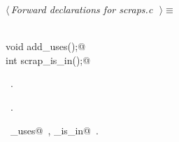 \documentclass{report}
\begin{document}
\begin{flushleft} \small
\begin{minipage}{\linewidth} \label{scrap225}
$\langle\,${\it Forward declarations for scraps.c}\nobreak\ {\footnotesize {}}$\,\rangle\equiv$
\vspace{-1ex}
\begin{list}{}{} \item
\mbox{}\verb@@\\
\mbox{}\verb@static void add_uses();@\\
\mbox{}\verb@static int scrap_is_in();@\\
\mbox{}\verb@@{\NWsep}
\end{list}
\vspace{-1ex}
\footnotesize\addtolength{\baselineskip}{-1ex}
\begin{list}{}{\setlength{\itemsep}{-\parsep}\setlength{\itemindent}{-\leftmargin}}
\item \NWtxtMacroDefBy\ .
\item \NWtxtMacroRefIn\ .
\end{list}
\vspace{-2ex}
\footnotesize\addtolength{\baselineskip}{-1ex}
\begin{list}{}{\setlength{\itemsep}{-\parsep}\setlength{\itemindent}{-\leftmargin}}
\item \NWtxtIdentsUsed\nobreak\  \verb@add_uses@\nobreak\ , \verb@scrap_is_in@\nobreak\ .\end{list}
\end{minipage}\\[4ex]
\end{flushleft}
\end{document}
